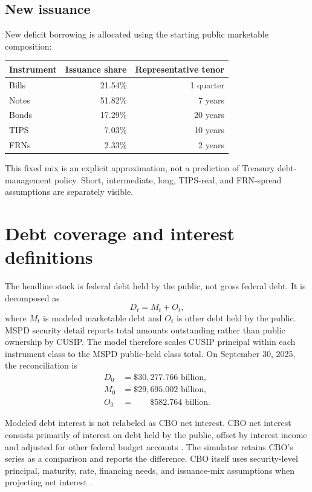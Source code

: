 \documentclass[10pt]{article}
\begin{document}
\subsection*{New issuance}

New deficit borrowing is allocated using the starting public marketable composition:
\begin{center}
\begin{tabular}{lrr}
\toprule
Instrument & Issuance share & Representative tenor \\
\midrule
Bills & 21.54\% & 1 quarter \\
Notes & 51.82\% & 7 years \\
Bonds & 17.29\% & 20 years \\
TIPS & 7.03\% & 10 years \\
FRNs & 2.33\% & 2 years \\
\bottomrule
\end{tabular}
\end{center}
This fixed mix is an explicit approximation, not a prediction of Treasury debt-management
policy.  Short, intermediate, long, TIPS-real, and FRN-spread assumptions are separately
visible.

\section{Debt coverage and interest definitions}

The headline stock is federal debt held by the public, not gross federal debt.  It is
decomposed as
\begin{equation}
 D_t=M_t+O_t,
\end{equation}
where $M_t$ is modeled marketable debt and $O_t$ is other debt held by the public.  MSPD
security detail reports total amounts outstanding rather than public ownership by CUSIP.
The model therefore scales CUSIP principal within each instrument class to the MSPD
public-held class total.  On September 30, 2025, the reconciliation is
\begin{align*}
 D_0 &= \$30{,}277.766\text{ billion},\\
 M_0 &= \$29{,}695.002\text{ billion},\\
 O_0 &= \phantom{\$30{,}}\$582.764\text{ billion}.
\end{align*}

Modeled debt interest is not relabeled as CBO net interest.  CBO net interest consists
primarily of interest on debt held by the public, offset by interest income and adjusted for
other federal budget accounts \cite{cbonetinterest}.  The simulator retains CBO's series as
a comparison and reports the difference.  CBO itself uses security-level principal,
maturity, rate, financing needs, and issuance-mix assumptions when projecting net interest
\cite{cbomethods}.
\end{document}
